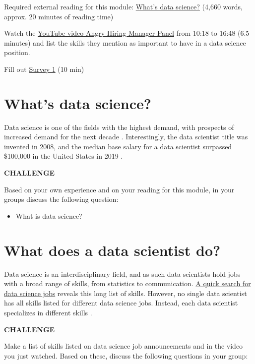 \documentclass[
]{book}
\providecommand{\tightlist}{%
  \setlength{\itemsep}{0pt}\setlength{\parskip}{0pt}}
\begin{document}
Required external reading for this module: \href{readings/module2_what_is_data_science.pdf}{What's data science?} (4,660 words, approx. 20 minutes of reading time)

Watch the \href{https://youtu.be/6OFm7YcunWc?t=617}{YouTube video Angry Hiring Manager Panel} from 10:18 to 16:48 (6.5 minutes) and list the skills they mention as important to have in a data science position.

Fill out \href{https://forms.gle/M8bndLeUQLSJFrH99}{Survey 1} (10 min)

\hypertarget{whats-data-science}{%
\section{What's data science?}\label{whats-data-science}}

Data science is one of the fields with the highest demand, with prospects of increased demand for the next decade \citep{kross2020democratization, hadavand2018can}. Interestingly, the data scientist title was invented in 2008, and the median base salary for a data scientist surpassed \$100,000 in the United States in 2019 \citep{robinson_nolis_2020}.

\textbf{CHALLENGE}

Based on your own experience and on your reading for this module, in your groups discuss the following question:

\begin{itemize}
\tightlist
\item
  What is data science?
\end{itemize}

\hypertarget{what-does-a-data-scientist-do}{%
\section{What does a data scientist do?}\label{what-does-a-data-scientist-do}}

Data science is an interdisciplinary field, and as such data scientists hold jobs with a broad range of skills, from statistics to communication. \href{https://www.indeed.com/jobs?q=data+science\&l=United+States}{A quick search for data science jobs} reveals this long list of skills. However, no single data scientist has all skills listed for different data science jobs. Instead, each data scientist specializes in different skills \citep{robinson_nolis_2020}.

\textbf{CHALLENGE}

Make a list of skills listed on data science job announcements and in the video you just watched. Based on these, discuss the following questions in your group:
\end{document}

